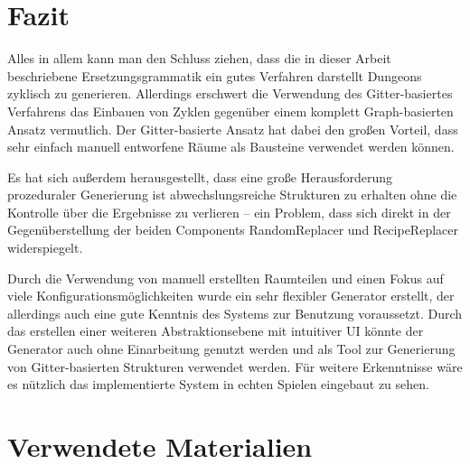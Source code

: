 



\chapter{Fazit}\label{c.zusammenfassung}

Alles in allem kann man den Schluss ziehen, dass die in dieser Arbeit beschriebene Ersetzungsgrammatik ein gutes Verfahren darstellt Dungeons zyklisch zu generieren. Allerdings erschwert die Verwendung des Gitter-basiertes Verfahrens das Einbauen von Zyklen gegenüber einem komplett Graph-basierten Ansatz vermutlich. Der Gitter-basierte Ansatz hat dabei den großen Vorteil, dass sehr einfach manuell entworfene Räume als Bausteine verwendet werden können.

Es hat sich außerdem herausgestellt, dass eine große Herausforderung prozeduraler Generierung ist abwechslungsreiche Strukturen zu erhalten ohne die Kontrolle über die Ergebnisse zu verlieren -- ein Problem, dass sich direkt in der Gegenüberstellung der beiden Components RandomReplacer und RecipeReplacer widerspiegelt. 

Durch die Verwendung von manuell erstellten Raumteilen und einen Fokus auf viele Konfigurationsmöglichkeiten wurde ein sehr flexibler Generator erstellt, der allerdings auch eine gute Kenntnis des Systems zur Benutzung voraussetzt. Durch das erstellen einer weiteren Abstraktionsebene mit intuitiver UI könnte der Generator auch ohne Einarbeitung genutzt werden und als Tool zur Generierung von Gitter-basierten Strukturen verwendet werden. Für weitere Erkenntnisse wäre es nützlich das implementierte System in echten Spielen eingebaut zu sehen. 

\chapter{Verwendete Materialien}

